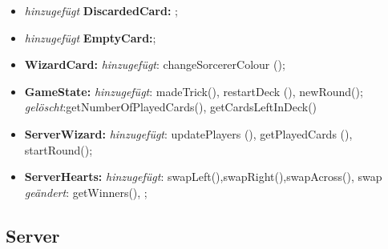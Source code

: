 \documentclass{article}
\begin{document}
\begin{itemize}
\item \textit{hinzugefügt} \textbf{DiscardedCard:} ;

\item \textit{hinzugefügt} \textbf{EmptyCard:};

\item \textbf{WizardCard:} \textit{hinzugefügt}: changeSorcererColour ();

\item \textbf{GameState:} \textit{hinzugefügt}: madeTrick(), restartDeck (), newRound(); \textit{gelöscht}:getNumberOfPlayedCards(), getCardsLeftInDeck()

\item \textbf{ServerWizard:} \textit{hinzugefügt}: updatePlayers (), getPlayedCards (),
startRound(); 

\item \textbf{ServerHearts:} \textit{hinzugefügt}: swapLeft(),swapRight(),swapAcross(), swap
\textit{geändert}: getWinners(),  ;
\end{itemize}

\subsection{Server}
\end{document}
